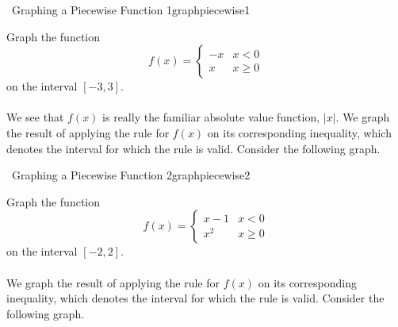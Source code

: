 		\begin{example}{\Difficulty\,\Difficulty\,\,Graphing a Piecewise Function 1}{graphpiecewise1}
		
			Graph the function
			\begin{equation*}
				f(x)=\begin{cases}
					-x & x < 0 \\
					x & x \geq 0
				\end{cases}
			\end{equation*}
			on the interval \([-3,3]\).
			\\
			\\
			We see that \(f(x)\) is really the familiar absolute value function, \(|x|\). We graph the result of applying the rule for \(f(x)\) on its corresponding inequality, which denotes the interval for which the rule is valid. Consider the following graph.
			\begin{center}
			\end{center}

		\end{example}
		\pagebreak
		\begin{example}{\Difficulty\,\Difficulty\,\,Graphing a Piecewise Function 2}{graphpiecewise2}
			
			Graph the function
			\begin{equation*}
				f(x)=\begin{cases}
					x-1 & x < 0 \\
					x^2 & x \geq 0
				\end{cases}
			\end{equation*}
			on the interval \([-2,2]\).
			\\
			\\
			We graph the result of applying the rule for \(f(x)\) on its corresponding inequality, which denotes the interval for which the rule is valid. Consider the following graph.
			\begin{center}
			\end{center}

		\end{example}
